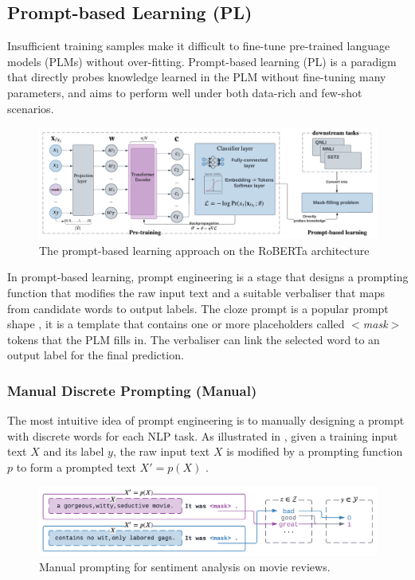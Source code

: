 \subsection{Prompt-based Learning (PL)}
Insufficient training samples make it difficult to fine-tune pre-trained language models (PLMs) without over-fitting. Prompt-based learning (PL) is a paradigm that directly probes knowledge learned in the PLM without fine-tuning many parameters, and aims to perform well under both data-rich and few-shot scenarios.

\begin{figure}[!ht]
    \centering
    \includegraphics[width=\hsize]{figures/preparation_media/prepare-prompting.pdf}
    \caption{The prompt-based learning approach on the RoBERTa architecture}
    \label{fig:prepare-prompting}
\end{figure}

In prompt-based learning, prompt engineering is a stage that designs a prompting function that modifies the raw input text and a suitable verbaliser that maps from candidate words to output labels. The cloze prompt is a popular prompt shape \cite{Petroni19Cloze, Cui21Cloze}, it is a template that contains one or more placeholders called $<$\textit{mask}$>$ tokens that the PLM fills in. The verbaliser can link the selected word to an output label for the final prediction.

\subsubsection{Manual Discrete Prompting (Manual)}
The most intuitive idea of prompt engineering is to manually designing a prompt with discrete words for each NLP task. As illustrated in , given a training input text $X$ and its label $y$, the raw input text $X$ is modified by a prompting function $p$ to form a prompted text $X' = p(X)$ \cite{Liu21}. 

\begin{figure}[!ht]
    \centering
    \includegraphics[width=\hsize]{figures/preparation_media/prepare-manual.pdf}
    \caption{Manual prompting for sentiment analysis on movie reviews.}
    \label{fig:prepare-manual}
\end{figure}

